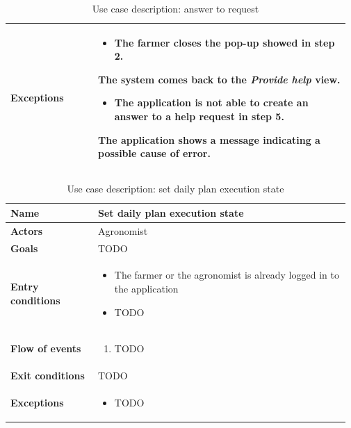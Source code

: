 \begin{table}[H]
\begin{tabular}{@{}p{0.25\linewidth} p{0.72\linewidth}@{}}
		\textbf{Exceptions}         & \begin{itemize}[leftmargin=.4cm,noitemsep,topsep=0pt,before=\vspace{-3mm}]
		   \item The farmer closes the pop-up showed in step 2.
		\end{itemize}
	    The system comes back to the \textit{Provide help} view.
	    \begin{itemize}[leftmargin=.4cm,noitemsep,topsep=0pt]
		   \item The application is not able to create an answer to a help request in step 5. 
		\end{itemize}
		The application shows a message indicating a possible cause of error.
		\\\bottomrule
	\end{tabular}
	\caption{Use case description: answer to request} 
\end{table}

\begin{table}[H]
    \centering
	\begin{tabular}{@{}p{0.25\linewidth} p{0.72\linewidth}@{}}
		\toprule
		\textbf{Name}               & Set daily plan execution state \\
		\midrule
		\textbf{Actors}             & Agronomist\\
		\midrule
		\textbf{Goals}              & TODO \\
		\midrule
		
		\textbf{Entry conditions}   & \begin{itemize}[leftmargin=.4cm,noitemsep,topsep=0pt,before=\vspace{-3mm},after=\vspace{-4mm}]
		    \item The farmer or the agronomist is already logged in to the application
		    \item TODO \todo{To be completed}
		\end{itemize}\\
		\midrule
		
		\textbf{Flow of events}     & \begin{enumerate}[leftmargin=.4cm,noitemsep,topsep=0pt,before=\vspace{-3mm},after=\vspace{-4mm}]
		    \item TODO
		\end{enumerate}\\
		\midrule
		\textbf{Exit conditions}    & TODO \\
		\midrule
		
		\textbf{Exceptions}         & \begin{itemize}[leftmargin=.4cm,noitemsep,topsep=0pt,before=\vspace{-3mm}]
		   \item TODO
		\end{itemize}
	    \\\bottomrule
	\end{tabular}
	\caption{Use case description: set daily plan execution state} 
\end{table}

